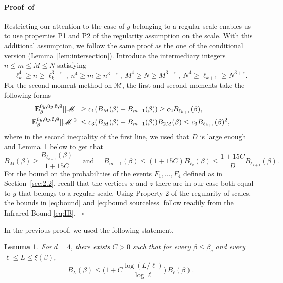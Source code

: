 \documentclass[a4paper,oneside,11pt]{article}
\newtheorem{lemma}[theorem]{Lemma}
\newcommand{\be}[1]{\begin{equation}\label{#1}}
\newcommand{\ee}{\end{equation}}
\numberwithin{equation}{section}
\numberwithin{equation}{section}
\numberwithin{equation}{section}
\newenvironment{proof}[1][\relax]%
  {\paragraph{Proof\ifx#1\relax\else~of #1\fi}}%
  {~\hfill$\square$\par\bigskip}
\newcommand{\calM}{\mathcal{M}}
\def\be{\begin{equation}}
\def\ee{\end{equation}}
\newcommand{\ep}{\varepsilon}
\begin{document}
\begin{proof}
 Restricting our attention to the case of $y$ belonging to a regular scale enables us to use properties P1 and P2 of the regularity assumption on the scale.
With this additional assumption, we follow the same proof as the one of the conditional version (Lemma~\ref{lem:intersection}).
Introduce the intermediary integers $n\le m\le M\le N$ satisfying 
\be 
\ell_k^4\ge n\ge \ell_{k}^{3+\ep}\ ,\  n^4\ge m\ge n^{3+\ep}\ ,\  M^4\ge N\ge M^{3+\ep}\ ,\ N^4\ge \ell_{k+1}\ge N^{3+\ep}.
\ee
For the second moment method on $\calM$, the first and second moments take the following forms
\begin{align}\label{eq:BB}{\bf E}^{0y,0y,\emptyset,\emptyset}_\beta[|\calM|]&\ge c_1 (B_M(\beta) -B_{m-1}(\beta))\ge c_2B_{\ell_{k+1}}(\beta),\\
{\bf E}^{0y,0y,\emptyset,\emptyset}_\beta[|\calM|^2]&\le c_3(B_M(\beta) -B_{m-1}(\beta))B_{2M}(\beta)\le c_3B_{\ell_{k+1}}(\beta)^2,
\end{align}
where in the second inequality of the first line, we used that $D$ is large enough and  Lemma~\ref{cor:growth} below to get that
\[
B_M(\beta)\ge \frac{B_{\ell_{k+1}}(\beta)}{1+15C}\quad\text{ and }\quad B_{m-1}(\beta)\le (1+15C)B_{\ell_k}(\beta)\le \frac{1+15C}{D}B_{\ell_{k+1}}(\beta).
\]
For the bound on the probabilities of the events $F_1,\dots,F_4$ defined as in Section~\ref{sec:2.2}, recall that the vertices $x$ and $z$ there are in our case both equal to $y$ that belongs to a regular scale.  Using Property 2 of the regularity of scales, the bounds in \eqref{eq:bound} and \eqref{eq:bound sourceless} follow readily from the Infrared Bound \eqref{eq:IB}.
\end{proof}

In the previous proof, we used the following statement.
\begin{lemma}\label{cor:growth}
For $d=4$, there exists $C>0$ such that for every $\beta\le \beta_c$ and every $\ell\le L\le\xi(\beta)$,
\be\label{eq:lemma1} B_{L}(\beta)\le \Big(1+C\frac{\log(L/\ell)}{\log \ell}\Big)\,B_{\ell}(\beta).\ee
\end{lemma}
\end{document}
